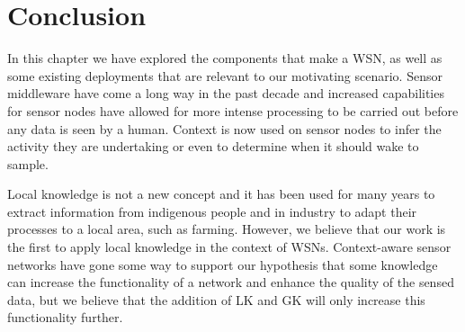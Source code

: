 



\section{Conclusion}\label{bg:conc}
	In this chapter we have explored the components that make a WSN, as well as some existing deployments that are relevant to our motivating scenario. Sensor middleware have come a long way in the past decade and increased capabilities for sensor nodes have allowed for more intense processing to be carried out before any data is seen by a human. Context is now used on sensor nodes to infer the activity they are undertaking or even to determine when it should wake to sample. 

Local knowledge is not a new concept and it has been used for many years to extract information from indigenous people and in industry to adapt their processes to a local area, such as farming. However, we believe that our work is the first to apply local knowledge in the context of WSNs. Context-aware sensor networks have gone some way to support our hypothesis that some knowledge can increase the functionality of a network and enhance the quality of the sensed data, but we believe that the addition of LK and GK will only increase this functionality further.

